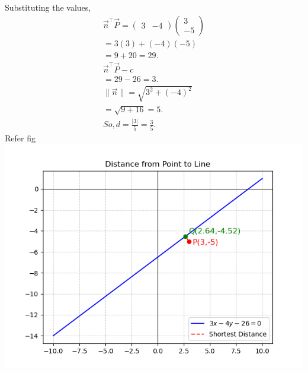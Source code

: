 \documentclass[journal]{IEEEtran}
\begin{document}
Substituting the values,
\begin{align}
\Vec{n}^\top \Vec{P} = \begin{pmatrix} 3 & -4 \end{pmatrix}
\begin{pmatrix} 3 \\ -5 \end{pmatrix}\\
= 3(3) + (-4)(-5)\\ = 9 + 20 = 29.\\
\Vec{n}^\top \vec{P} - c\\ = 29 - 26 = 3.\\
\|\vec{n}\| = \sqrt{3^2 + (-4)^2}\\ = \sqrt{9+16} = 5.\\
So,
d = \frac{|3|}{5} = \frac{3}{5}.
\end{align}
Refer fig
 \centering
\includegraphics[width=\columnwidth, height=0.8\textheight, keepaspectratio]{figs/Figure_7.png}     
\end{document}
